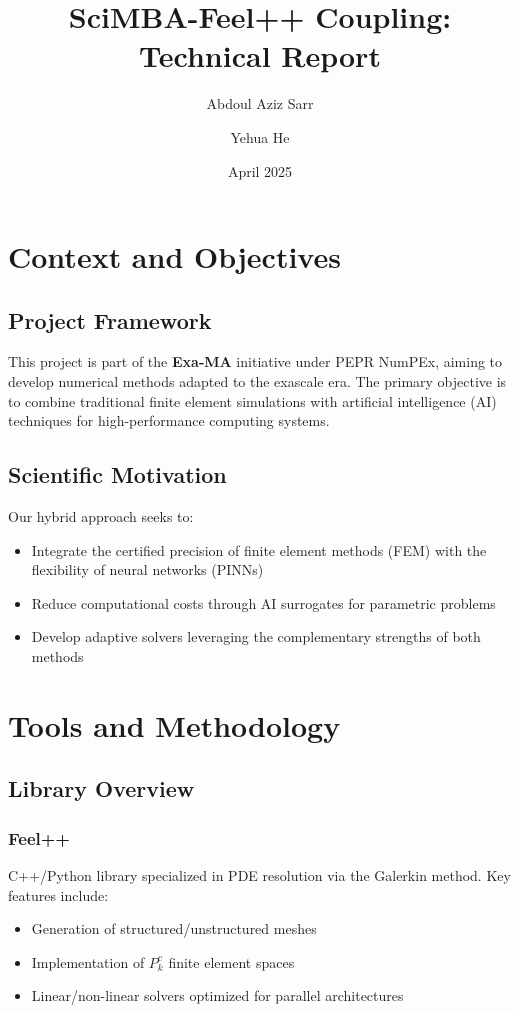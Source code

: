 \documentclass{article}
\title{SciMBA-Feel++ Coupling: Technical Report}
\author{Abdoul Aziz Sarr \and Yehua He}
\date{April 2025}
\begin{document}
\maketitle

\section{Context and Objectives}
\subsection{Project Framework}
This project is part of the \textbf{Exa-MA} initiative under PEPR NumPEx, aiming to develop numerical methods adapted to the exascale era. The primary objective is to combine traditional finite element simulations with artificial intelligence (AI) techniques for high-performance computing systems.

\subsection{Scientific Motivation}
Our hybrid approach seeks to:
\begin{itemize}
\item Integrate the certified precision of finite element methods (FEM) with the flexibility of neural networks (PINNs)
\item Reduce computational costs through AI surrogates for parametric problems
\item Develop adaptive solvers leveraging the complementary strengths of both methods
\end{itemize}

\section{Tools and Methodology}
\subsection{Library Overview}
\subsubsection{Feel++}
C++/Python library specialized in PDE resolution via the Galerkin method. Key features include:
\begin{itemize}
\item Generation of structured/unstructured meshes
\item Implementation of \( P_k^c \) finite element spaces
\item Linear/non-linear solvers optimized for parallel architectures
\end{itemize}
\end{document}
